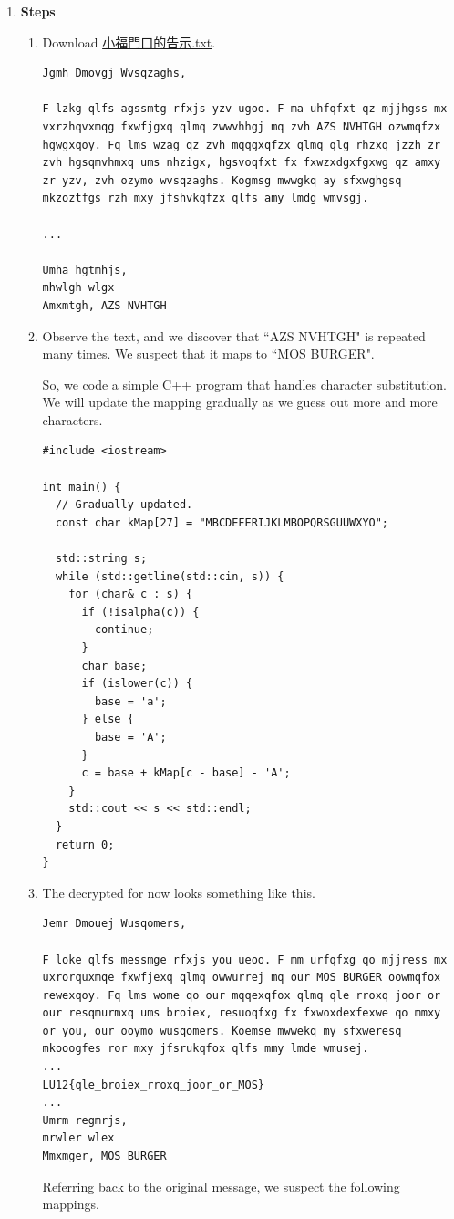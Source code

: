 \documentclass[12pt, a4paper]{article}
\begin{document}
\begin{enumerate}[label=(\alph*)]
    \pagebreak
    \item \textbf{Steps}
    \begin{enumerate}[label=(\arabic*)]
      \item Download \href{https://drive.google.com/file/d/1XcwAgPA3HW6MzDrwJdStTmXGwMelPqFg/view?usp=drive_link}{小福門口的告示.txt}.
      \begin{Verbatim}[frame=single, fontsize=\scriptsize, breaklines]
Jgmh Dmovgj Wvsqzaghs,

F lzkg qlfs agssmtg rfxjs yzv ugoo. F ma uhfqfxt qz mjjhgss mx vxrzhqvxmqg fxwfjgxq qlmq zwwvhhgj mq zvh AZS NVHTGH ozwmqfzx hgwgxqoy. Fq lms wzag qz zvh mqqgxqfzx qlmq qlg rhzxq jzzh zr zvh hgsqmvhmxq ums nhzigx, hgsvoqfxt fx fxwzxdgxfgxwg qz amxy zr yzv, zvh ozymo wvsqzaghs. Kogmsg mwwgkq ay sfxwghgsq mkzoztfgs rzh mxy jfshvkqfzx qlfs amy lmdg wmvsgj.

...

Umha hgtmhjs,
mhwlgh wlgx
Amxmtgh, AZS NVHTGH
      \end{Verbatim}
      \item Observe the text, and we discover that ``AZS NVHTGH" is repeated many times. We
      suspect that it maps to ``MOS BURGER".

      So, we code a simple C++ program that handles character substitution. We
      will update the mapping gradually as we guess out more and more characters.
      \begin{verbatim}
#include <iostream>

int main() {
  // Gradually updated.
  const char kMap[27] = "MBCDEFERIJKLMBOPQRSGUUWXYO";

  std::string s;
  while (std::getline(std::cin, s)) {
    for (char& c : s) {
      if (!isalpha(c)) {
        continue;
      }
      char base;
      if (islower(c)) {
        base = 'a';
      } else {
        base = 'A';
      }
      c = base + kMap[c - base] - 'A';
    }
    std::cout << s << std::endl;
  }
  return 0;
}
      \end{verbatim}

      \item The decrypted for now looks something like this.
      \begin{Verbatim}[frame=single, fontsize=\scriptsize, breaklines]
Jemr Dmouej Wusqomers,

F loke qlfs messmge rfxjs you ueoo. F mm urfqfxg qo mjjress mx uxrorquxmqe fxwfjexq qlmq owwurrej mq our MOS BURGER oowmqfox rewexqoy. Fq lms wome qo our mqqexqfox qlmq qle rroxq joor or our resqmurmxq ums broiex, resuoqfxg fx fxwoxdexfexwe qo mmxy or you, our ooymo wusqomers. Koemse mwwekq my sfxweresq mkooogfes ror mxy jfsrukqfox qlfs mmy lmde wmusej.
...
LU12{qle_broiex_rroxq_joor_or_MOS}
...
Umrm regmrjs,
mrwler wlex
Mmxmger, MOS BURGER
      \end{Verbatim}
      Referring back to the original message, we suspect the following mappings.


\end{enumerate}
\end{enumerate}
\end{document}
